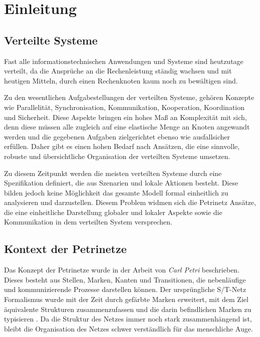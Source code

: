 \chapter{Einleitung}

\section{Verteilte Systeme}

	Fast alle informationstechnischen Anwendungen und Systeme sind heutzutage verteilt, da die Ansprüche an die Rechenleistung ständig wachsen und mit heutigen Mitteln, durch einen Rechenknoten kaum noch zu bewältigen sind. \bigbreak

	Zu den wesentlichen Aufgabestellungen der verteilten Systeme, gehören Konzepte wie Parallelität, Synchronisation, Kommunikation, Kooperation, Koordination und Sicherheit. Diese Aspekte bringen ein hohes Maß an Komplexität mit sich, denn diese müssen alle zugleich auf eine elastische Menge an Knoten angewandt werden und die gegebenen Aufgaben zielgerichtet ebenso wie ausfallsicher erfüllen. Daher gibt es einen hohen Bedarf nach Ansätzen, die eine sinnvolle, robuste und übersichtliche Organisation der verteilten Systeme umsetzen. \bigbreak

	Zu diesem Zeitpunkt werden die meisten verteilten Systeme durch eine Spezifikation definiert, die aus Szenarien und lokale Aktionen besteht. Diese bilden jedoch keine Möglichkeit das gesamte Modell formal einheitlich zu analysieren und darzustellen. Diesem Problem widmen sich die Petrinetz Ansätze, die eine einheitliche Darstellung globaler und lokaler Aspekte sowie die Kommunikation in dem verteilten System versprechen. \cite{ochsenschlager2013modellierung}

\section{Kontext der Petrinetze} \label{sec:KdP} 

	Das Konzept der Petrinetze wurde in der Arbeit von \textit{Carl Petri} beschrieben. Dieses besteht aus Stellen, Marken, Kanten und Transitionen, die nebenläufige und kommunizierende Prozesse darstellen können. Der ursprüngliche S/T-Netz Formalismus wurde mit der Zeit durch gefärbte Marken erweitert, mit dem Ziel äquivalente Strukturen zusammenzufassen und die darin befindlichen Marken zu typisieren \cite{Kummer02}. Da die Struktur des Netzes immer noch stark zusammenhängend ist, bleibt die Organisation des Netzes schwer verständlich für das menschliche Auge.\bigbreak

